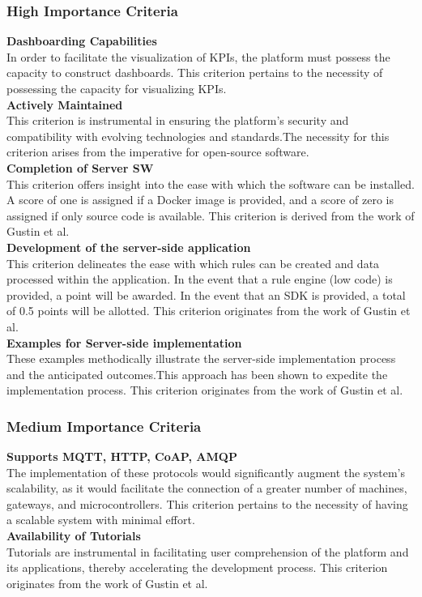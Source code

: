 \subsubsection{High Importance Criteria}
\textbf{Dashboarding Capabilities}\\
In order to facilitate the visualization of KPIs, the platform must possess the capacity to construct dashboards. This criterion pertains to the necessity of possessing the capacity for visualizing KPIs.\\
\textbf{Actively Maintained}\\
This criterion is instrumental in ensuring the platform's security and compatibility with evolving technologies and standards.The necessity for this criterion arises from the imperative for open-source software.\\
\textbf{Completion of Server SW}\\
This criterion offers insight into the ease with which the software can be installed. A score of one is assigned if a Docker image is provided, and a score of zero is assigned if only source code is available. This criterion is derived from the work of Gustin et al.\\
\textbf{Development of the server-side application}\\
This criterion delineates the ease with which rules can be created and data processed within the application. In the event that a rule engine (low code) is provided, a point will be awarded. In the event that an SDK is provided, a total of 0.5 points will be allotted. This criterion originates from the work of Gustin et al.\\
\textbf{Examples for Server-side implementation}\\
These examples methodically illustrate the server-side implementation process and the anticipated outcomes.This approach has been shown to expedite the implementation process.
This criterion originates from the work of Gustin et al.

\subsubsection{Medium Importance Criteria}
\textbf{Supports MQTT, HTTP, CoAP, AMQP}\\
The implementation of these protocols would significantly augment the system's scalability, as it would facilitate the connection of a greater number of machines, gateways, and microcontrollers. This criterion pertains to the necessity of having a scalable system with minimal effort.\\
\textbf{Availability of Tutorials}\\
Tutorials are instrumental in facilitating user comprehension of the platform and its applications, thereby accelerating the development process. This criterion originates from the work of Gustin et al.


